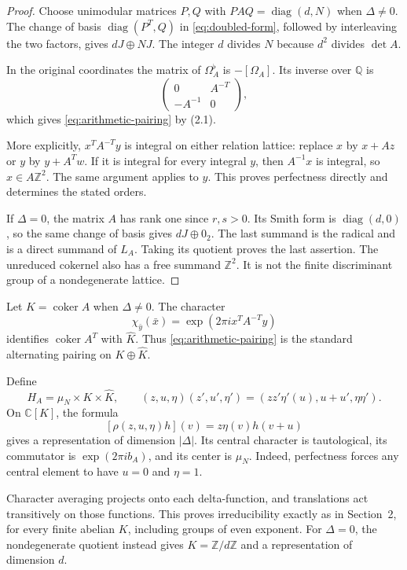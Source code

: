 \documentclass[11pt]{article}
\numberwithin{equation}{section}
\begin{document}
\begin{proof}
Choose unimodular matrices $P,Q$ with $PAQ=\operatorname{diag}(d,N)$
when $\Delta\ne0$.  The change of basis
$\operatorname{diag}(P^T,Q)$ in \eqref{eq:doubled-form}, followed by
interleaving the two factors, gives $dJ\oplus NJ$.
The integer $d$ divides $N$ because $d^2$ divides $\det A$.

In the original coordinates the matrix of $\Omega_A^\flat$ is
$-[\Omega_A]$.  Its inverse over $\mathbb Q$ is
\[
        \begin{pmatrix}0&A^{-T}\\-A^{-1}&0\end{pmatrix},
\]
which gives \eqref{eq:arithmetic-pairing} by (2.1).

More explicitly, $x^TA^{-T}y$ is integral on either relation lattice:
replace $x$ by $x+Az$ or $y$ by $y+A^Tw$.
If it is integral for every integral $y$, then $A^{-1}x$ is integral,
so $x\in A\mathbb Z^2$.  The same argument applies to $y$.
This proves perfectness directly and determines the stated orders.

If $\Delta=0$, the matrix $A$ has rank one since $r,s>0$.
Its Smith form is $\operatorname{diag}(d,0)$, so the same change of
basis gives $dJ\oplus0_2$.  The last summand is the radical and is a
direct summand of $L_A$.  Taking its quotient proves the last assertion.
The unreduced cokernel also has a free summand $\mathbb Z^2$.
It is not the finite discriminant group of a nondegenerate lattice.
\end{proof}

Let $K=\operatorname{coker}A$ when $\Delta\ne0$.
The character
\[
 \chi_{\bar y}(\bar x)=\exp(2\pi i x^TA^{-T}y)
\]
identifies $\operatorname{coker}A^T$ with $\widehat K$.
Thus \eqref{eq:arithmetic-pairing} is the standard alternating pairing
on $K\oplus\widehat K$.

Define
\[
 H_A=\mu_N\times K\times\widehat K,\qquad
 (z,u,\eta)(z',u',\eta')=(zz'\eta'(u),u+u',\eta\eta').
\]
On $\mathbb C[K]$, the formula
\[
                 [\rho(z,u,\eta)h](v)=z\eta(v)h(v+u)
\]
gives a representation of dimension $|\Delta|$.
Its central character is tautological, its commutator is
$\exp(2\pi i b_A)$, and its center is $\mu_N$.
Indeed, perfectness forces any central element to have $u=0$ and
$\eta=1$.

Character averaging projects onto each delta-function,
and translations act transitively on those functions.
This proves irreducibility exactly as in Section~2, for every finite
abelian $K$, including groups of even exponent.
For $\Delta=0$, the nondegenerate quotient instead gives
$K=\mathbb Z/d\mathbb Z$ and a representation of dimension $d$.
\end{document}
